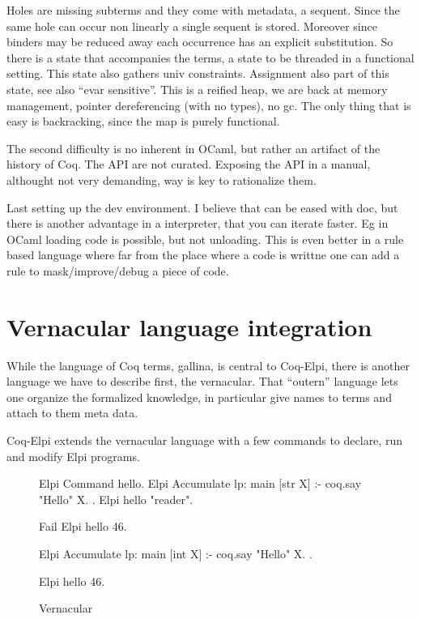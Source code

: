 \documentclass[a4paper, 11pt]{book}
\begin{document}
Holes are missing subterms and they come with metadata, a sequent.
Since the same hole can occur non linearly a single sequent is stored.
Moreover since binders may be reduced away each occurrence has an explicit
substitution. So there is a state that accompanies the terms, a state to be
threaded in a functional setting. This state also gathers univ constraints.
Assignment also part of this state, see also ``evar sensitive''. This is
a reified heap, we are back at memory management, pointer dereferencing (with no
types), no gc. The only thing that is easy is backracking, since the map is
purely functional.

The second difficulty is no inherent in OCaml, but rather an artifact of the
history of Coq. The API are not curated. Exposing the API in a manual, althought
not very demanding, way is key to rationalize them.


Last setting up the dev environment. I believe that can be eased with doc, but
there is another advantage in a interpreter, that you can iterate faster. Eg
in OCaml loading code is possible, but not unloading. This is even better in
a rule based language where far from the place where a code is writtne one
can add a rule to mask/improve/debug a piece of code.

\section{Vernacular language integration}

While the language of Coq terms, gallina, is central to Coq-Elpi, there is another
language we have to describe first, the vernacular. That ``outern'' language
lets one organize the formalized knowledge, in particular give names to terms
and attach to them meta data.

Coq-Elpi extends the vernacular language with a few commands to declare, run
and modify Elpi programs.



\begin{figure}
\begin{coqcode}
Elpi Command hello.
Elpi Accumulate lp:{{
  main [str X] :- coq.say "Hello" X.
}}.
Elpi hello "reader".

Fail Elpi hello 46.

Elpi Accumulate lp:{{
  main [int X] :- coq.say "Hello" X.
}}.

Elpi hello 46.
\end{coqcode}
\caption[Vernacular]{Vernacular\label{vernac}}
\end{figure}
\end{document}
